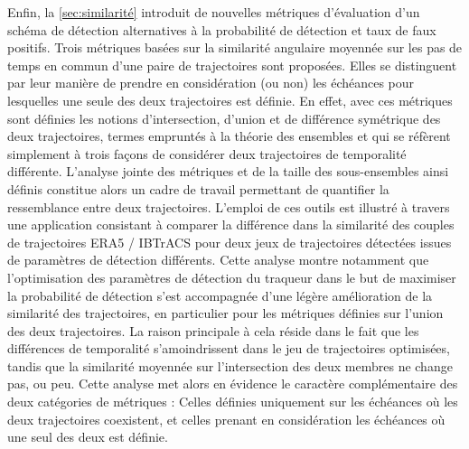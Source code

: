 \documentclass[../main.tex]{subfiles}
\begin{document}
Enfin, la \cref{sec:similarité} introduit de nouvelles métriques d'évaluation d'un schéma de détection alternatives à la probabilité de détection et taux de
faux positifs. Trois métriques basées sur la similarité angulaire moyennée sur les pas de temps en commun d'une paire de trajectoires sont proposées. Elles se
distinguent par leur manière de prendre en considération (ou non) les échéances pour lesquelles une seule des deux trajectoires est définie. En effet, avec ces
métriques sont définies les notions d'intersection, d'union et de différence symétrique des deux trajectoires, termes empruntés à la théorie des ensembles et
qui se réfèrent simplement à trois façons de considérer deux trajectoires de temporalité différente. L'analyse jointe des métriques et de la taille des
sous-ensembles ainsi définis constitue alors un cadre de travail permettant de quantifier la ressemblance entre deux trajectoires. L'emploi de ces outils est
illustré à travers une application consistant à comparer la différence dans la similarité des couples de trajectoires ERA5 / IBTrACS pour deux jeux de
trajectoires détectées issues de paramètres de détection différents. Cette analyse montre notamment que l'optimisation des paramètres de détection du traqueur
dans le but de maximiser la probabilité de détection s'est accompagnée d'une légère amélioration de la similarité des trajectoires, en particulier pour les
métriques définies sur l'union des deux trajectoires. La raison principale à cela réside dans le fait que les différences de temporalité s'amoindrissent dans le
jeu de trajectoires optimisées, tandis que la similarité moyennée sur l'intersection des deux membres ne change pas, ou peu. Cette analyse met alors en évidence
le caractère complémentaire des deux catégories de métriques : Celles définies uniquement sur les échéances où les deux trajectoires coexistent, et celles
prenant en considération les échéances où une seul des deux est définie.
\end{document}
